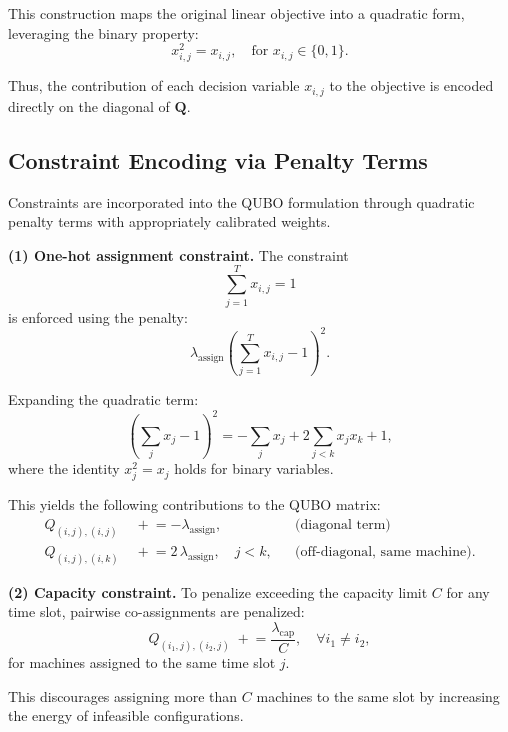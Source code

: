 This construction maps the original linear objective into a quadratic form, leveraging the binary property:
\begin{equation}
x_{i,j}^2 = x_{i,j}, \quad \text{for } x_{i,j} \in \{0,1\}.
\end{equation}

Thus, the contribution of each decision variable $x_{i,j}$ to the objective is encoded directly on the diagonal of $\mathbf{Q}$.

\subsection{Constraint Encoding via Penalty Terms}
Constraints are incorporated into the QUBO formulation through quadratic penalty terms with appropriately calibrated weights.

\textbf{(1) One-hot assignment constraint.}  
The constraint
\begin{equation}
\sum_{j=1}^{T} x_{i,j} = 1
\end{equation}
is enforced using the penalty:
\begin{equation}
\lambda_{\text{assign}} \left( \sum_{j=1}^{T} x_{i,j} - 1 \right)^2.
\end{equation}

Expanding the quadratic term:
\begin{equation}
\left( \sum_{j} x_j - 1 \right)^2 
= - \sum_{j} x_j + 2 \sum_{j<k} x_j x_k + 1,
\end{equation}
where the identity $x_j^2 = x_j$ holds for binary variables.

This yields the following contributions to the QUBO matrix:
\begin{align}
Q_{(i,j),(i,j)} &\;\mathrel{+}= -\lambda_{\text{assign}}, 
&& \text{(diagonal term)} \\
Q_{(i,j),(i,k)} &\;\mathrel{+}= 2\,\lambda_{\text{assign}}, \quad j < k,
&& \text{(off-diagonal, same machine)}.
\end{align}

\textbf{(2) Capacity constraint.}  
To penalize exceeding the capacity limit $C$ for any time slot, pairwise co-assignments are penalized:
\begin{equation}
Q_{(i_1,j),(i_2,j)} \;\mathrel{+}= \frac{\lambda_{\text{cap}}}{C}, 
\quad \forall i_1 \neq i_2,
\end{equation}
for machines assigned to the same time slot $j$.

This discourages assigning more than $C$ machines to the same slot by increasing the energy of infeasible configurations.

